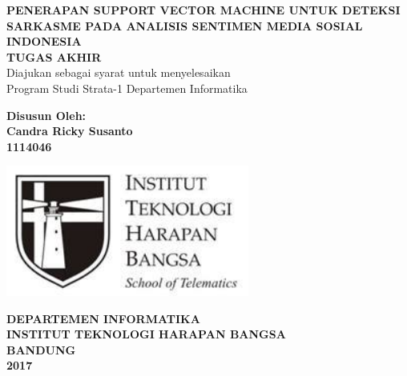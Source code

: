 \begin{titlepage}
\begin{center}
	\onehalfspacing
	{\large \bfseries PENERAPAN SUPPORT VECTOR MACHINE UNTUK DETEKSI SARKASME PADA ANALISIS SENTIMEN MEDIA SOSIAL INDONESIA\\
	\vspace{1.5cm}
	 \large TUGAS AKHIR}\\
           Diajukan sebagai syarat untuk menyelesaikan\\ Program Studi Strata-1 Departemen Informatika

	\vspace{1.5cm}
          {\bfseries Disusun Oleh: \\
           Candra Ricky Susanto \\
	1114046}
	
	\vspace{1.5cm}
	\includegraphics[width=8cm]{images/ithb.jpg}
	
	
	\vspace{3.5cm}
	
{\large \bfseries DEPARTEMEN INFORMATIKA \\
INSTITUT TEKNOLOGI HARAPAN BANGSA \\
BANDUNG\\
2017}

	
\end{center}

\end{titlepage}

\newpage